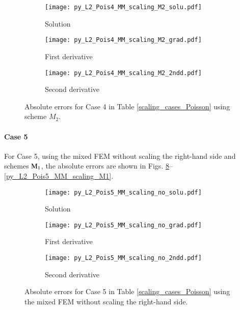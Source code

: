 \documentclass[review,3p]{elsarticle}
\begin{document}
\begin{figure}[!ht]
    \begin{subfigure}{5.5cm}
        \texttt{[image: py\_L2\_Pois4\_MM\_scaling\_M2\_solu.pdf]}
        \caption{Solution}
        \label{py_L2_Pois4_MM_scaling_M2_solu}
    \end{subfigure}
    \hspace{-0.2cm}
    \begin{subfigure}{5.5cm}
        \texttt{[image: py\_L2\_Pois4\_MM\_scaling\_M2\_grad.pdf]}
        \caption{First derivative}
        \label{py_L2_Pois4_MM_scaling_M2_grad}
    \end{subfigure}
    \hspace{-0.2cm}
    \begin{subfigure}{5.5cm}
        \texttt{[image: py\_L2\_Pois4\_MM\_scaling\_M2\_2ndd.pdf]}
        \caption{Second derivative}
        \label{py_L2_Pois4_MM_scaling_M2_2ndd}
    \end{subfigure}
\caption{Absolute errors for Case 4 in Table \ref{scaling_cases_Poisson} using scheme $M_2$.}
\label{py_L2_Pois4_MM_scaling_M2}
\end{figure}
% 

\newpage
\paragraph{Case 5}
For Case 5, using the mixed FEM without scaling the right-hand side and schemes ${\rm M}_1$, the absolute errors are shown in Figs. \ref{py_L2_Pois5_MM_scaling_no}--\ref{py_L2_Pois5_MM_scaling_M1}.

\begin{figure}[!ht]
    \begin{subfigure}{5.5cm}
        \texttt{[image: py\_L2\_Pois5\_MM\_scaling\_no\_solu.pdf]}
        \caption{Solution}
        \label{py_L2_Pois5_MM_scaling_no_solu}
    \end{subfigure}
    \hspace{-0.2cm}
    \begin{subfigure}{5.5cm}
        \texttt{[image: py\_L2\_Pois5\_MM\_scaling\_no\_grad.pdf]}
        \caption{First derivative}
        \label{py_L2_Pois5_MM_scaling_no_grad}
    \end{subfigure}
    \hspace{-0.2cm}
    \begin{subfigure}{5.5cm}
        \texttt{[image: py\_L2\_Pois5\_MM\_scaling\_no\_2ndd.pdf]}
        \caption{Second derivative}
        \label{py_L2_Pois5_MM_scaling_no_2ndd}
    \end{subfigure}
\caption{Absolute errors for Case 5 in Table \ref{scaling_cases_Poisson} using the mixed FEM without scaling the right-hand side.}
\label{py_L2_Pois5_MM_scaling_no}
\end{figure}
\end{document}

